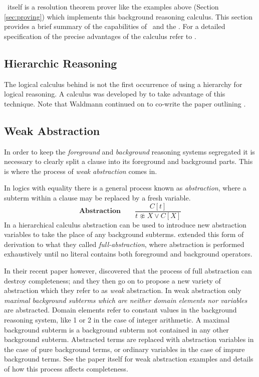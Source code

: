 \Beagle\ itself is a resolution theorem prover like the examples above (Section \ref{sec:proving})
which implements this background reasoning calculus. This section provides a brief
summary of the capabilities of \beagle\ and the \HSWAC. For a detailed specification
of the precise advantages of the calculus refer to \cite{baum13}.

\subsection{Hierarchic Reasoning}
\label{sec:hier}
The logical calculus behind {\beagle} is not the first occurrence of using a hierarchy for
logical reasoning. A calculus was developed by  to take advantage
of this technique. Note that Waldmann continued on to co-write the paper outlining
{\HSWA} \cite{baum13}.


\subsection{Weak Abstraction}
In order to keep the \emph{foreground} and \emph{background} reasoning
systems segregated it is necessary to clearly split a clause into its foreground
and background parts. This is where the process of \emph{weak abstraction} comes in.

In logics with equality there is a general process known as \emph{abstraction},
where a subterm within a clause may be replaced by a fresh variable.
\[\textbf{Abstraction}\quad\quad \frac{C[t]}{t\not\approx X \lor C[X]}\]
In a hierarchical calculus abstraction can be used to introduce new abstraction variables to take the place
of any background subterms.  extended this form of derivation to what they called \emph{full-abstraction},
where abstraction is performed exhaustively until no literal contains both foreground
and background operators.

In their recent paper however,  discovered that the process 
of full abstraction can destroy completeness; and they then go on to propose a new
variety of abstraction which they refer to as \emph{weak} abstraction. 
In weak abstraction only \emph{maximal background subterms which are
neither domain elements nor variables} are abstracted. Domain elements refer
to constant values in the background reasoning system, like 1 or 2 in the case of
integer arithmetic. A maximal background subterm
is a background subterm not contained in any other background subterm. Abstracted terms are replaced
with abstraction variables in the case of pure background terms, or ordinary variables
in the case of impure background terms. See the paper itself for weak abstraction
examples and details of how this process affects completeness.

